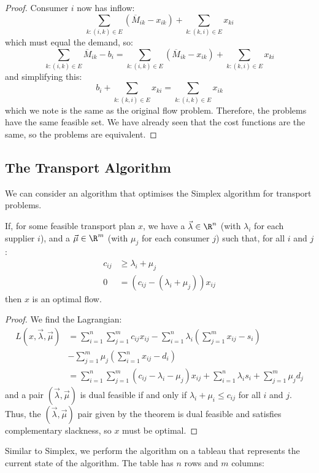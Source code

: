 \documentclass[../Main.tex]{subfiles}
\begin{document}
\begin{proof}
    Consumer $i$ now has inflow:
    \begin{equation*}
        \sum_{k:(i, k) \in E} \left(\overline{M}_{ik} - x_{ik}\right) + \sum_{k : (k, i) \in E} x_{ki}
    \end{equation*}
    which must equal the demand, so:
    \begin{equation*}
        \sum_{k : (i, k) \in E} \overline{M}_{ik} - b_i = \sum_{k : (i, k) \in E} (\overline{M}_{ik} - x_{ik}) + \sum_{k : (k, i) \in E} x_{ki}
    \end{equation*}
    and simplifying this:
    \begin{equation*}
        b_i + \sum_{k : (k, i) \in E} x_{ki} = \sum_{k : (i, k) \in E} x_{ik}
    \end{equation*}
    which we note is the same as the original flow problem. Therefore, the problems have the same feasible set. We have already seen that the cost functions are the same, so the problems are equivalent.
\end{proof}
\subsection{The Transport Algorithm}
We can consider an algorithm that optimises the Simplex algorithm for transport problems. 
\begin{theorem}
    If, for some feasible transport plan $x$, we have a $\vec{\lambda} \in \R^n$ (with $\lambda_i$ for each supplier $i$), and a $\vec{\mu} \in \R^m$ (with $\mu_j$ for each consumer $j$) such that, for all $i$ and $j$:
    \begin{align*}
        c_{ij} &\geq \lambda_i + \mu_j \\
        0 &= (c_{ij} - (\lambda_i + \mu_j)) x_{ij}
    \end{align*}
    then $x$ is an optimal flow.
\end{theorem}
\begin{proof}
    We find the Lagrangian:
    \begin{align*}
        L(x, \vec{\lambda}, \vec{\mu}) &= \sum_{i = 1}^n \sum_{j = 1}^m c_{ij} x_{ij} - \sum_{i = 1}^n \lambda_i \left(\sum_{j = 1}^m x_{ij} - s_i\right)\\
        &- \sum_{j = 1}^m \mu_j \left(\sum_{i = 1}^n x_{ij} - d_i\right) \\
        &= \sum_{i = 1}^n \sum_{j = 1}^m (c_{ij} - \lambda_i - \mu_j) x_{ij} + \sum_{i = 1}^n \lambda_i s_i + \sum_{j = 1}^m \mu_j d_j
    \end{align*}
    and a pair $(\vec{\lambda}, \vec{\mu})$ is dual feasible if and only if $\lambda_i + \mu_i \leq c_{ij}$ for all $i$ and $j$. Thus, the $(\vec{\lambda}, \vec{\mu})$ pair given by the theorem is dual feasible and satisfies complementary slackness, so $x$ must be optimal.
\end{proof}
Similar to Simplex, we perform the algorithm on a tableau that represents the current state of the algorithm. The table has $n$ rows and $m$ columns:
\end{document}
